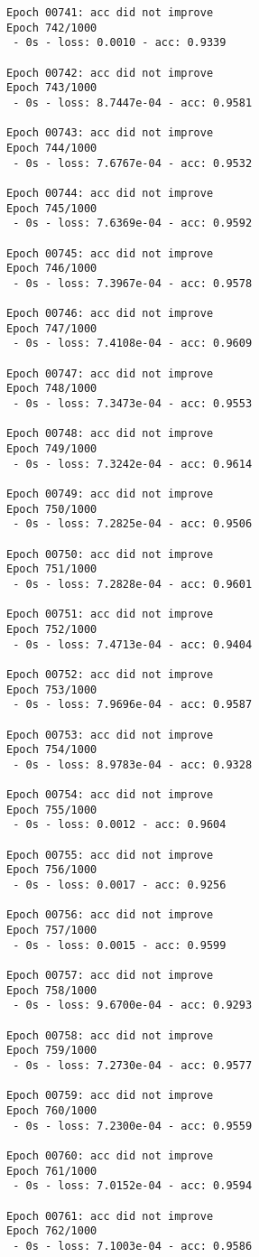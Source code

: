 \documentclass[11pt]{article}
\begin{document}
\begin{Verbatim}[commandchars=\\\{\}]
Epoch 00741: acc did not improve
Epoch 742/1000
 - 0s - loss: 0.0010 - acc: 0.9339

Epoch 00742: acc did not improve
Epoch 743/1000
 - 0s - loss: 8.7447e-04 - acc: 0.9581

Epoch 00743: acc did not improve
Epoch 744/1000
 - 0s - loss: 7.6767e-04 - acc: 0.9532

Epoch 00744: acc did not improve
Epoch 745/1000
 - 0s - loss: 7.6369e-04 - acc: 0.9592

Epoch 00745: acc did not improve
Epoch 746/1000
 - 0s - loss: 7.3967e-04 - acc: 0.9578

Epoch 00746: acc did not improve
Epoch 747/1000
 - 0s - loss: 7.4108e-04 - acc: 0.9609

Epoch 00747: acc did not improve
Epoch 748/1000
 - 0s - loss: 7.3473e-04 - acc: 0.9553

Epoch 00748: acc did not improve
Epoch 749/1000
 - 0s - loss: 7.3242e-04 - acc: 0.9614

Epoch 00749: acc did not improve
Epoch 750/1000
 - 0s - loss: 7.2825e-04 - acc: 0.9506

Epoch 00750: acc did not improve
Epoch 751/1000
 - 0s - loss: 7.2828e-04 - acc: 0.9601

Epoch 00751: acc did not improve
Epoch 752/1000
 - 0s - loss: 7.4713e-04 - acc: 0.9404

Epoch 00752: acc did not improve
Epoch 753/1000
 - 0s - loss: 7.9696e-04 - acc: 0.9587

Epoch 00753: acc did not improve
Epoch 754/1000
 - 0s - loss: 8.9783e-04 - acc: 0.9328

Epoch 00754: acc did not improve
Epoch 755/1000
 - 0s - loss: 0.0012 - acc: 0.9604

Epoch 00755: acc did not improve
Epoch 756/1000
 - 0s - loss: 0.0017 - acc: 0.9256

Epoch 00756: acc did not improve
Epoch 757/1000
 - 0s - loss: 0.0015 - acc: 0.9599

Epoch 00757: acc did not improve
Epoch 758/1000
 - 0s - loss: 9.6700e-04 - acc: 0.9293

Epoch 00758: acc did not improve
Epoch 759/1000
 - 0s - loss: 7.2730e-04 - acc: 0.9577

Epoch 00759: acc did not improve
Epoch 760/1000
 - 0s - loss: 7.2300e-04 - acc: 0.9559

Epoch 00760: acc did not improve
Epoch 761/1000
 - 0s - loss: 7.0152e-04 - acc: 0.9594

Epoch 00761: acc did not improve
Epoch 762/1000
 - 0s - loss: 7.1003e-04 - acc: 0.9586


\end{Verbatim}
\end{document}
